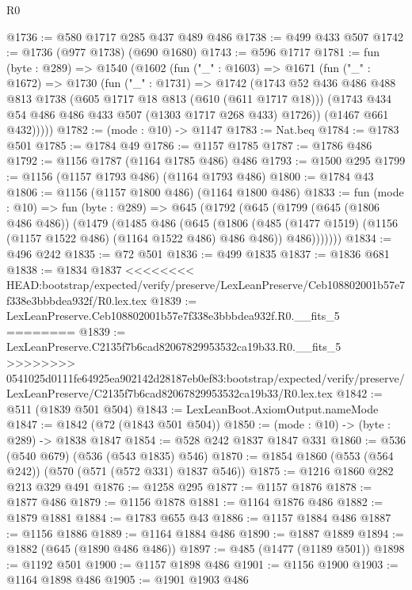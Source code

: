 \begin{lexlean}{R0}
\begin{coremodule}
{{{{{{{{{{{{{{{{{{{@1736 := @580 @1717 @285 @437 @489 @486
@1738 := @499 @433 @507
@1742 := @1736 (@977 @1738) (@690 @1680)
@1743 := @596 @1717
@1781 := fun (byte : @289) =>
  @1540
    (@1602
      (fun ("_" : @1603) =>
      @1671
        (fun ("_" : @1672) =>
        @1730
          (fun ("_" : @1731) =>
          @1742
            (@1743
              @52
              @436
              @486
              @488
              @813
              @1738
              (@605 @1717 @18 @813 (@610 (@611 @1717 @18)))
              (@1743 @434 @54 @486 @486 @433 @507 (@1303 @1717 @268 @433) @1726))
            (@1467 @661 @432)))))
@1782 := (mode : @10) -> @1147
@1783 := Nat.beq
@1784 := @1783 @501
@1785 := @1784 @49
@1786 := @1157 @1785
@1787 := @1786 @486
@1792 := @1156 @1787 (@1164 @1785 @486) @486
@1793 := @1500 @295
@1799 := @1156 (@1157 @1793 @486) (@1164 @1793 @486)
@1800 := @1784 @43
@1806 := @1156 (@1157 @1800 @486) (@1164 @1800 @486)
@1833 := fun (mode : @10) =>
  fun (byte : @289) =>
  @645
    (@1792
      (@645
        (@1799
          (@645 (@1806 @486 @486))
          (@1479
            (@1485
              @486
              (@645
                (@1806
                  (@485 (@1477 @1519) (@1156 (@1157 @1522 @486) (@1164 @1522 @486) @486 @486))
                  @486)))))))
@1834 := @496 @242
@1835 := @72 @501
@1836 := @499 @1835
@1837 := @1836 @681
@1838 := @1834 @1837
<<<<<<<< HEAD:bootstrap/expected/verify/preserve/LexLeanPreserve/Ceb108802001b57e7f338e3bbbdea932f/R0.lex.tex
@1839 := LexLeanPreserve.Ceb108802001b57e7f338e3bbbdea932f.R0.__fits_5
========
@1839 := LexLeanPreserve.C2135f7b6cad82067829953532ca19b33.R0.__fits_5
>>>>>>>> 0541025d0111fe64925ea902142d28187eb0ef83:bootstrap/expected/verify/preserve/LexLeanPreserve/C2135f7b6cad82067829953532ca19b33/R0.lex.tex
@1842 := @511 (@1839 @501 @504)
@1843 := LexLeanBoot.AxiomOutput.nameMode
@1847 := @1842 (@72 (@1843 @501 @504))
@1850 := (mode : @10) -> (byte : @289) -> @1838 @1847
@1854 := @528 @242 @1837 @1847 @331
@1860 := @536 (@540 @679) (@536 (@543 @1835) @546)
@1870 := @1854 @1860 (@553 (@564 @242)) (@570 (@571 (@572 @331) @1837 @546))
@1875 := @1216 @1860 @282 @213 @329 @491
@1876 := @1258 @295
@1877 := @1157 @1876
@1878 := @1877 @486
@1879 := @1156 @1878
@1881 := @1164 @1876 @486
@1882 := @1879 @1881
@1884 := @1783 @655 @43
@1886 := @1157 @1884 @486
@1887 := @1156 @1886
@1889 := @1164 @1884 @486
@1890 := @1887 @1889
@1894 := @1882 (@645 (@1890 @486 @486))
@1897 := @485 (@1477 (@1189 @501))
@1898 := @1192 @501
@1900 := @1157 @1898 @486
@1901 := @1156 @1900
@1903 := @1164 @1898 @486
@1905 := @1901 @1903 @486
}}}}}}}}}}}}}}}}}}}
\end{coremodule}
\end{lexlean}
